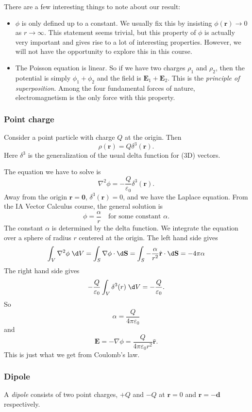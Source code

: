 \documentclass[a4paper]{article}
\begin{document}
There are a few interesting things to note about our result:
\begin{itemize}
  \item $\phi$ is only defined up to a constant. We usually fix this by insisting $\phi(\mathbf{r}) \to 0$ as $r\to \infty$. This statement seems trivial, but this property of $\phi$ is actually very important and gives rise to a lot of interesting properties. However, we will not have the opportunity to explore this in this course.
  \item The Poisson equation is linear. So if we have two charges $\rho_1$ and $\rho_2$, then the potential is simply $\phi_1 + \phi_2$ and the field is $\mathbf{E}_1 + \mathbf{E}_2$. This is the \emph{principle of superposition}. Among the four fundamental forces of nature, electromagnetism is the only force with this property.
\end{itemize}
\subsubsection{Point charge}
Consider a point particle with charge $Q$ at the origin. Then
\[
  \rho (\mathbf{r}) = Q\delta^3(\mathbf{r}).
\]
Here $\delta^3$ is the generalization of the usual delta function for (3D) vectors.

The equation we have to solve is
\[
  \nabla^2\phi = -\frac{Q}{\varepsilon_0}\delta^3(\mathbf{r}).
\]
Away from the origin $\mathbf{r} = \mathbf{0}$, $\delta^3(\mathbf{r}) = 0$, and we have the Laplace equation. From the IA Vector Calculus course, the general solution is
\[
  \phi = \frac{\alpha}{r}\quad \text{for some constant }\alpha.
\]
The constant $\alpha$ is determined by the delta function. We integrate the equation over a sphere of radius $r$ centered at the origin. The left hand side gives
\[
  \int_V \nabla^2\phi\;\d V = \int_S \nabla\phi\cdot\d \mathbf{S} = \int_S -\frac{\alpha}{r^2} \hat{\mathbf{r}}\cdot \d \mathbf{S} = -4\pi\alpha
\]
The right hand side gives
\[
  -\frac{Q}{\varepsilon_0}\int_V\delta^3(r)\; \d V = -\frac{Q}{\varepsilon_0}.
\]
So
\[
  \alpha = \frac{Q}{4\pi \varepsilon_0}
\]
and
\[
  \mathbf{E} = -\nabla \phi = \frac{Q}{4\pi\varepsilon_0 r^2}\hat{\mathbf{r}}.
\]
This is just what we get from Coulomb's law.
\subsubsection{Dipole}
\begin{defi}[Dipole]
  A \emph{dipole} consists of two point charges, $+Q$ and $-Q$ at $\mathbf{r} = 0$ and $\mathbf{r} = -\mathbf{d}$ respectively.
\end{defi}
\end{document}
